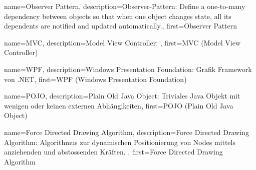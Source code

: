 {
	name={Observer Pattern},
	description={Observer-Pattern: 	Define a one-to-many dependency between objects so that when one object changes state, all its dependents are notified and updated automatically.},
	first={Observer Pattern}
}

{
	name={MVC},
	description={Model View Controller: },
	first={MVC (Model View Controller)}
}

{
	name={WPF},
	description={Windows Presentation Foundation: Grafik Framework von .NET},
	first={WPF (Windows Presentation Foundation)}
}

{
	name={POJO},
	description={Plain Old Java Object: Triviales Java Objekt mit wenigen oder keinen externen Abhängikeiten},
	first={POJO (Plain Old Java Object)}
}

{
	name={Force Directed Drawing Algorithm},
	description={Force Directed Drawing Algorithm: Algorithmus zur dynamischen Positionierung von Nodes mittels anziehenden und abstossenden Kräften. },
	first={Force Directed Drawing Algorithm}
}



